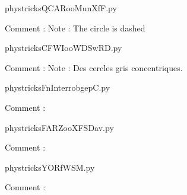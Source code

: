 
    \newcommand{\CaptionFigQCARooMunXfF}{<+Type your caption here+>}
    \begin{center}
        
    \end{center}
    phystricksQCARooMunXfF.py

    Comment : Note : The circle is dashed

    \clearpage
    


    \newcommand{\CaptionFigCFWIooWDSwRD}{<+Type your caption here+>}
    \begin{center}
        
    \end{center}
    phystricksCFWIooWDSwRD.py

    Comment : Note : Des cercles gris concentriques.

    \clearpage
    


    \newcommand{\CaptionFigFnInterrobgepC}{<+Type your caption here+>}
    \begin{center}
        
    \end{center}
    phystricksFnInterrobgepC.py

    Comment : 

    \clearpage
    


    \newcommand{\CaptionFigFARZooXFSDav}{<+Type your caption here+>}
    \begin{center}
        
    \end{center}
    phystricksFARZooXFSDav.py

    Comment : 

    \clearpage
    


    \newcommand{\CaptionFigYORfWSM}{<+Type your caption here+>}
    \begin{center}
        
    \end{center}
    phystricksYORfWSM.py

    Comment : 

    \clearpage
    



